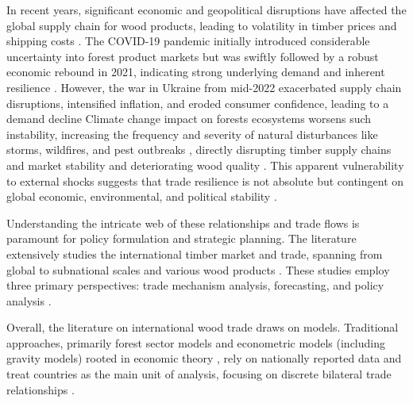 \documentclass[
  authoryear,
  review,
  3p]{elsarticle}
\begin{document}
In recent years, significant economic and geopolitical disruptions have
affected the global supply chain for wood products, leading to
volatility in timber prices and shipping costs
\citep{2024fao, 2022unecefao}. The COVID-19 pandemic initially
introduced considerable uncertainty into forest product markets but was
swiftly followed by a robust economic rebound in 2021, indicating strong
underlying demand and inherent resilience \citep{2022unecefao}. However,
the war in Ukraine from mid-2022 exacerbated supply chain disruptions,
intensified inflation, and eroded consumer confidence, leading to a
demand decline \citep{2022unecefao} Climate change impact on forests
ecosystems worsens such instability, increasing the frequency and
severity of natural disturbances like storms, wildfires, and pest
outbreaks
\citep{seidl2011unraveling, seidl2017climate, curtis2018classifying, tyukavina2022global, patacca2023significant},
directly disrupting timber supply chains and market stability and
deteriorating wood quality \citep{garcia2025forest}. This apparent
vulnerability to external shocks suggests that trade resilience is not
absolute but contingent on global economic, environmental, and political
stability \citep{garcia2025forest, ma2025modelling}.

Understanding the intricate web of these relationships and trade flows
is paramount for policy formulation and strategic planning. The
literature extensively studies the international timber market and
trade, spanning from global to subnational scales and various wood
products \citep[\emph{e.g.},][
\citet{shen_structural_2022}]{muller2004long, raunikar2010global, caurla2013stimulating, van2014global, buongiorno2015global, rougieux2017modelling, rougieux2021impacts}.
These studies employ three primary perspectives: trade mechanism
analysis, forecasting, and policy analysis
\citep{buongiorno2016gravity, riviere2020representations, mathieu2023meta}.

Overall, the literature on international wood trade draws on models.
Traditional approaches, primarily forest sector models and econometric
models (including gravity models) rooted in economic theory
\citep{buongiorno1996forest, kallio2004global, latta2013review, northway2013forest, buongiorno2015global},
rely on nationally reported data and treat countries as the main unit of
analysis, focusing on discrete bilateral trade relationships
\citep{amador2017networks, shen_structural_2022}.
\end{document}
